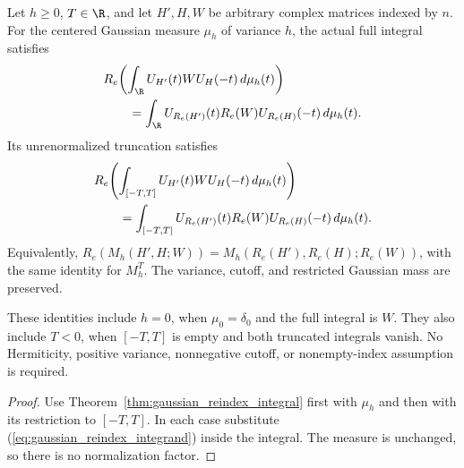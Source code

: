 \begin{theorem}
    \label{thm:gaussian_reindex_filters}
    \leanok
    Let $h\ge0$, $T\in\R$, and let $H',H,W$ be arbitrary complex
    matrices indexed by $n$. For the centered Gaussian measure $\mu_h$
    of variance $h$, the actual full integral satisfies
    \begin{align}
        &R_e\!\left(\int_{\R}U_{H'}(t)WU_H(-t)\,d\mu_h(t)\right)
            \label{eq:gaussian_reindex_full_integral}\\
        &\qquad=\int_{\R}U_{R_e(H')}(t)R_e(W)U_{R_e(H)}(-t)\,d\mu_h(t).
            \notag
    \end{align}
    Its unrenormalized truncation satisfies
    \begin{align}
        &R_e\!\left(\int_{[-T,T]}U_{H'}(t)WU_H(-t)\,d\mu_h(t)\right)
            \label{eq:gaussian_reindex_truncated_integral}\\
        &\qquad=\int_{[-T,T]}U_{R_e(H')}(t)R_e(W)U_{R_e(H)}(-t)\,d\mu_h(t).
            \notag
    \end{align}
    Equivalently, $R_e(M_h(H',H;W))=M_h(R_e(H'),R_e(H);R_e(W))$,
    with the same identity for $M_h^T$. The variance, cutoff, and
    restricted Gaussian mass are preserved.

    These identities include $h=0$, when $\mu_0=\delta_0$ and the full
    integral is $W$. They also include $T<0$, when $[-T,T]$ is empty
    and both truncated integrals vanish. No Hermiticity, positive
    variance, nonnegative cutoff, or nonempty-index assumption is
    required.
\end{theorem}
\begin{proof}\leanok
    Use Theorem~\ref{thm:gaussian_reindex_integral} first with $\mu_h$
    and then with its restriction to $[-T,T]$. In each case substitute
    (\ref{eq:gaussian_reindex_integrand}) inside the integral. The
    measure is unchanged, so there is no normalization factor.
\end{proof}
